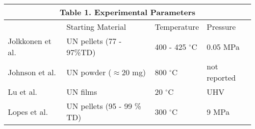 \documentclass[11pt]{article}
\begin{document}
\par 



\begin{tabular}{ |p{3cm}|p{3cm}|p{3cm}|p{3cm}|  }
	\hline
	\multicolumn{4}{|c|}{\textbf{Table 1.} Experimental Parameters} \\
	\hline
	 & Starting Material &Temperature & Pressure\\
	\hline
	Jolkkonen et al. \cite{Jolkkonen2017}   &  UN pellets (77 - 97\%TD) &400 - 425 $^{\circ}$C&  0.05 MPa \\
	Johnson et al. \cite{Johnson2016}   & UN powder ($\approx$20 mg)     &800 $^{\circ}$C&  not reported \\
	Lu et al. \cite{Lu2016}  & UN films    &20 $^{\circ}$C&   UHV \\
	Lopes et al. \cite{Lopes2017}   & UN pellets (95 - 99 \% TD)    & 300 $^{\circ}$C&   9 MPa \\
	\hline
\end{tabular}
\end{document}
